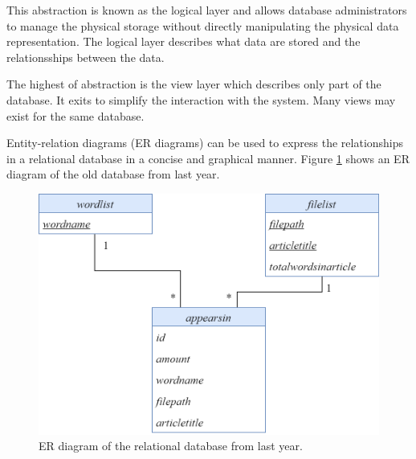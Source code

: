 This abstraction is known as the logical layer and allows database administrators to manage the physical storage without directly manipulating the physical data representation.
The logical layer describes what data are stored and the relationsships between the data.

The highest of abstraction is the view layer which describes only part of the database. It exits to simplify the interaction with the system. Many views may exist for the same database.

Entity-relation diagrams (ER diagrams) can be used to express the relationships in a relational database in a concise and graphical manner.
Figure \ref{olddatabase} shows an ER diagram of the old database from last year.

\begin{figure}[h]
    \centering
    \includegraphics[width=\linewidth]{Images/old wordcount db.PNG}
    \caption{ER diagram of the relational database from last year.}
    \label{olddatabase}
\end{figure}